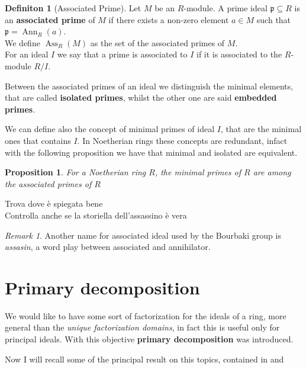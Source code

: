 \documentclass[]{book}
\theoremstyle{plain}
\newtheorem{prop}[teo]{Proposition}
\theoremstyle{remark}
\newtheorem{rem}{Remark}
\theoremstyle{definition}
\newtheorem{deff}[teo]{Definiton}
\newcommand{\p}{\mathfrak{p}}
\DeclareMathOperator{\Ann}{Ann}
\DeclareMathOperator{\Ass}{Ass}
\begin{document}
\begin{deff}[Associated Prime]
Let $ M $ be an $ R $-module. A prime ideal $ \p \subseteq R $ is an \textbf{associated prime} of $ M $ if there exists a non-zero element $ a \in M $ such that $ \p = \Ann_R (a)$. \\
We define $ \Ass_R(M) $ as the set of the associated primes of $ M $.\\
For an ideal $ I $ we say that a prime is associated to $ I $ if it is associated to the $ R $-module $ R/I $.
\end{deff}

Between the associated primes of an ideal we distinguish the minimal elements, that are called \textbf{isolated primes}, whilst the other one are said \textbf{embedded primes}.

We can define also the concept of minimal primes of ideal $ I $, that are the minimal ones that contains $ I $. In Noetherian rings these concepts are redundant, infact with the following proposition we have that minimal and isolated are equivalent. 

\begin{prop} \label{prop:minprimes}
	For a Noetherian ring $ R$, the minimal primes of $ R $ are among the associated primes of $ R $
\end{prop}

\begin{tcolorbox}
	Trova dove è spiegata bene\\
	Controlla anche se la storiella dell'assassino è vera
\end{tcolorbox}

\begin{rem}
	Another name for associated ideal used by the Bourbaki group is \textit{assasin}, a word play between associated and annihilator. %
\end{rem}

\section{Primary decomposition}

We would like to have some sort of factorization for the ideals of a ring, more general than the \textit{unique factorization domains}, in fact this is useful only for principal ideals. With this objective \textbf{primary decomposition} was introduced. 

Now I will recall some of the principal result on this topics, contained in \cite[Section 7]{Reid} and \cite[Section 4 and Page 83]{AMCD}
\end{document}
